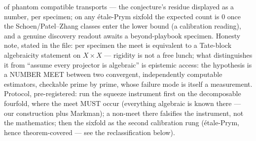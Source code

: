 \documentclass[11pt]{article}
\theoremstyle{definition}
\theoremstyle{remark}
\begin{document}
of phantom compatible transports --- the conjecture's residue
displayed as a number, per specimen; on any \'etale-Prym sixfold the
expected count is $0$ once the Schoen/Patel--Zhang classes enter the
lower bound (a calibration reading), and a genuine discovery readout
awaits a beyond-playbook specimen.  Honesty
note, stated in the file: per specimen the meet is equivalent to a
Tate-block algebraicity statement on $X\times X$ --- rigidity is not
a free lunch; what distinguishes it from ``assume every projector is
algebraic'' is epistemic access: the hypothesis is a NUMBER MEET
between two convergent, independently computable estimators,
checkable prime by prime, whose failure mode is itself a measurement.
Protocol, pre-registered: run the squeeze instrument first on the
decomposable fourfold, where the meet MUST occur (everything
algebraic is known there --- our construction plus Markman); a
non-meet there falsifies the instrument, not the mathematics; then
the sixfold as the second calibration rung (\'etale-Prym, hence
theorem-covered --- see the reclassification below).
\end{document}
